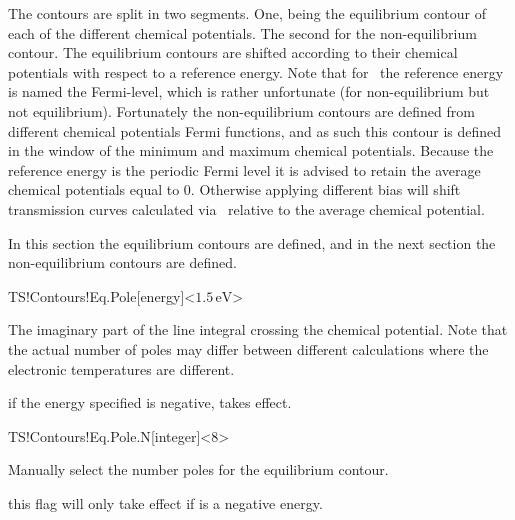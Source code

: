 The contours are split in two segments. One, being the equilibrium
contour of each of the different chemical potentials. The second for
the non-equilibrium contour. The equilibrium contours are shifted
according to their chemical potentials with respect to a reference
energy. Note that for \tsiesta\ the reference energy is named the
Fermi-level, which is rather unfortunate (for non-equilibrium but not
equilibrium). Fortunately the non-equilibrium contours are defined
from different chemical potentials Fermi functions, and as such this
contour is defined in the window of the minimum and maximum chemical
potentials. Because the reference energy is the periodic Fermi level
it is advised to retain the average chemical potentials equal to
$0$. Otherwise applying different bias will shift transmission curves
calculated via \tbtrans\ relative to the average chemical potential.

In this section the equilibrium contours are defined, and in the next
section the non-equilibrium contours are defined.

\begin{fdfentry}{TS!Contours!Eq.Pole}[energy]<$1.5\,\mathrm{eV}$>

  The imaginary part of the line integral crossing the chemical
  potential. Note that the actual number of poles may differ between
  different calculations where the electronic temperatures are
  different.

  \note if the energy specified is negative,
   takes effect.
  
\end{fdfentry}

\begin{fdfentry}{TS!Contours!Eq.Pole.N}[integer]<8>

  Manually select the number poles for the equilibrium contour. 

  \note this flag will only take effect if 
  is a negative energy.
  
\end{fdfentry}

